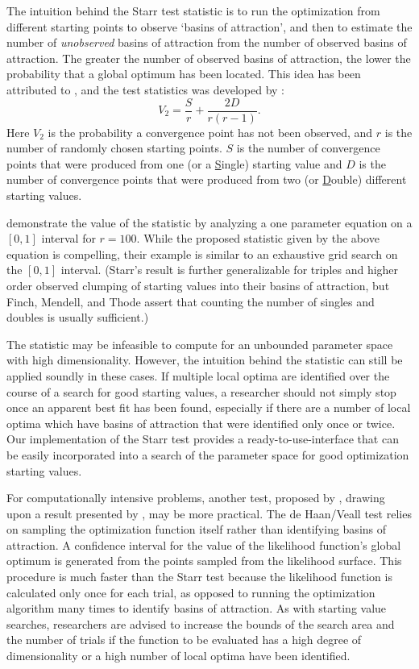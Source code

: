 \documentclass[11pt]{article}
\begin{document}
The intuition behind the Starr test statistic is to run the optimization from 
different starting points to observe `basins of attraction', and then to
estimate the number of \emph{unobserved} basins of attraction from the
number of observed basins of attraction. The greater the number
of observed basins of attraction, the lower the probability that a
global optimum has been located. This idea has been attributed to \citet{Turing48},
and the test statistics was developed by \citet{Starr79}:
\begin{equation}\label{Starr.test.equation}
    V_{2}=\frac{S}{r}+\frac{2D}{r\left( r-1\right)}.
\end{equation} Here $V_2$ is the probability a convergence
point has not been observed, and $r$ is the number of randomly
chosen starting points. $S$ is the number of convergence points
that were produced from one (or a {\underline{S}}ingle) starting
value and $D$ is the number of convergence points that were
produced from two (or {\underline{D}}ouble) different starting
values. 

\citet{FinMenTho89} demonstrate the value of the
statistic by analyzing a one parameter equation on a $[0,1]$
interval for $r = 100$. While the proposed statistic given by the
above equation is compelling, their example is similar to an
exhaustive grid search on the $[0,1]$ interval. 
(Starr's result is further generalizable for triples and
higher order observed clumping of starting values into their
basins of attraction, but Finch, Mendell, and Thode assert that
counting the number of singles and doubles is usually sufficient.)

The statistic may be infeasible to compute for an unbounded parameter space with 
high dimensionality. However, the intuition behind the statistic
can still be applied soundly in these cases. If multiple local optima are identified over the
course of a search for good starting values, a researcher should
not simply stop once an apparent best fit has been found,
especially if there are a number of local optima which have basins
of attraction that were identified only once or twice. Our implementation
of the Starr test provides a ready-to-use-interface that can be 
easily incorporated into a search of the parameter space for good optimization 
starting values.

For computationally intensive problems, another test, proposed by \citet{Veall90}, drawing upon a 
result presented by \citet{deHaan81}, may be more practical. The de Haan/Veall test relies on
 sampling the optimization function itself rather than
identifying basins of attraction. A confidence interval for 
the value of the likelihood function's global optimum is generated from
the points sampled from the likelihood surface. This procedure is much faster than the Starr
test because the likelihood function is calculated only once for each 
trial, as opposed to running the optimization algorithm many times to identify basins of attraction. As with starting value searches, researchers are
advised to increase the bounds of the search area and the number
of trials if the function to be evaluated has a high degree of
dimensionality or a high number of local optima have been
identified.
\end{document}
